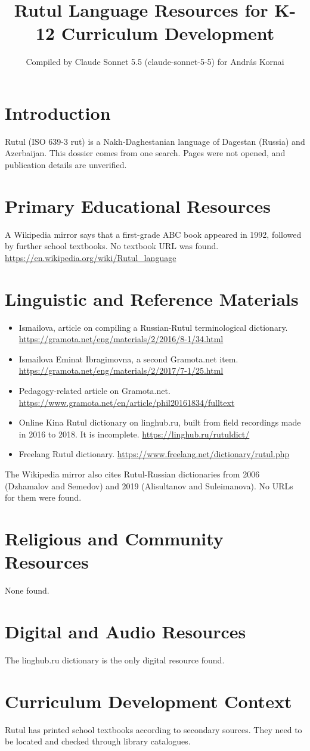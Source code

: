 \documentclass[12pt]{article}
\title{Rutul Language Resources for K-12 Curriculum Development}
\author{Compiled by Claude Sonnet 5.5 (claude-sonnet-5-5) for Andr\'as Kornai}
\date{}
\begin{document}
\maketitle
\section{Introduction}
Rutul (ISO 639-3 rut) is a Nakh-Daghestanian language of Dagestan (Russia) and Azerbaijan. This dossier comes from one search. Pages were not opened, and publication details are unverified.

\section{Primary Educational Resources}
A Wikipedia mirror says that a first-grade ABC book appeared in 1992, followed by further school textbooks. No textbook URL was found. \url{https://en.wikipedia.org/wiki/Rutul_language}

\section{Linguistic and Reference Materials}
\begin{itemize}
\item Ismailova, article on compiling a Russian-Rutul terminological dictionary. \url{https://gramota.net/eng/materials/2/2016/8-1/34.html}
\item Ismailova Eminat Ibragimovna, a second Gramota.net item. \url{https://gramota.net/eng/materials/2/2017/7-1/25.html}
\item Pedagogy-related article on Gramota.net. \url{https://www.gramota.net/en/article/phil20161834/fulltext}
\item Online Kina Rutul dictionary on linghub.ru, built from field recordings made in 2016 to 2018. It is incomplete. \url{https://linghub.ru/rutuldict/}
\item Freelang Rutul dictionary. \url{https://www.freelang.net/dictionary/rutul.php}
\end{itemize}
The Wikipedia mirror also cites Rutul-Russian dictionaries from 2006 (Dzhamalov and Semedov) and 2019 (Alisultanov and Suleimanova). No URLs for them were found.

\section{Religious and Community Resources}
None found.

\section{Digital and Audio Resources}
The linghub.ru dictionary is the only digital resource found.

\section{Curriculum Development Context}
Rutul has printed school textbooks according to secondary sources. They need to be located and checked through library catalogues.
\end{document}
